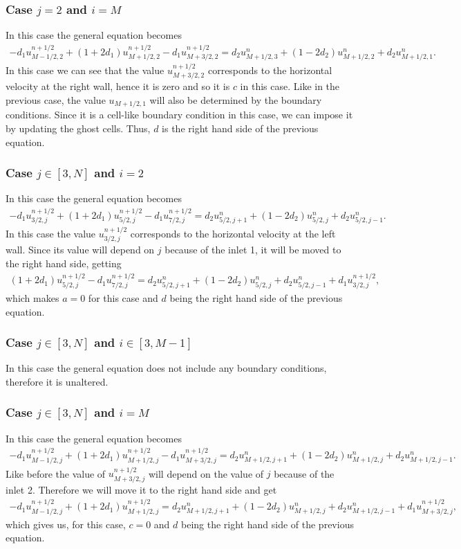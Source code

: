 \subsubsection*{Case $j=2$ and $i=M$}
In this case the general equation becomes
\begin{align*}
-d_1u_{M-1/2,2}^{n+1/2}+(1+2d_1)u_{M+1/2,2}^{n+1/2}-d_1u_{M+3/2,2}^{n+1/2}=d_2u_{M+1/2,3}^{n}+(1-2d_2)u_{M+1/2,2}^{n}+d_2u_{M+1/2,1}^{n}.
\end{align*}
In this case we can see that the value $u_{M+3/2,2}^{n+1/2}$ corresponds to the horizontal velocity at the right wall, hence it is zero and so it is $c$ in this case. Like in the previous case, the value $u_{M+1/2,1}$ will also be determined by the boundary conditions. Since it is a cell-like boundary condition in this case, we can impose it by updating the ghost cells. Thus, $d$ is the right hand side of the previous equation.

\subsubsection*{Case $j\in[3,N]$ and $i=2$}
In this case the general equation becomes
\begin{align*}
-d_1u_{3/2,j}^{n+1/2}+(1+2d_1)u_{5/2,j}^{n+1/2}-d_1u_{7/2,j}^{n+1/2}=d_2u_{5/2,j+1}^{n}+(1-2d_2)u_{5/2,j}^{n}+d_2u_{5/2,j-1}^{n}.
\end{align*}
In this case the value $u_{3/2,j}^{n+1/2}$ corresponds to the horizontal velocity at the left wall. Since its value will depend on $j$ because of the inlet 1, it will be moved to the right hand side, getting
\begin{align*}
(1+2d_1)u_{5/2,j}^{n+1/2}-d_1u_{7/2,j}^{n+1/2}=d_2u_{5/2,j+1}^{n}+(1-2d_2)u_{5/2,j}^{n}+d_2u_{5/2,j-1}^{n}+d_1u_{3/2,j}^{n+1/2},
\end{align*}
which makes $a=0$ for this case and $d$ being the right hand side of the previous equation.

\subsubsection*{Case $j\in[3,N]$ and $i\in[3,M-1]$}
In this case the general equation does not include any boundary conditions, therefore it is unaltered.
\subsubsection*{Case $j\in[3,N]$ and $i=M$}
In this case the general equation becomes
\begin{align*}
-d_1u_{M-1/2,j}^{n+1/2}+(1+2d_1)u_{M+1/2,j}^{n+1/2}-d_1u_{M+3/2,j}^{n+1/2}=d_2u_{M+1/2,j+1}^{n}+(1-2d_2)u_{M+1/2,j}^{n}+d_2u_{M+1/2,j-1}^{n}.
\end{align*}
Like before the value of $u_{M+3/2,j}^{n+1/2}$ will depend on the value of $j$ because of the inlet 2. Therefore we will move it to the right hand side and get
\begin{align*}
-d_1u_{M-1/2,j}^{n+1/2}+(1+2d_1)u_{M+1/2,j}^{n+1/2}=d_2u_{M+1/2,j+1}^{n}+(1-2d_2)u_{M+1/2,j}^{n}+d_2u_{M+1/2,j-1}^{n}+d_1u_{M+3/2,j}^{n+1/2},
\end{align*}
which gives us, for this case, $c=0$ and $d$ being the right hand side of the previous equation.


